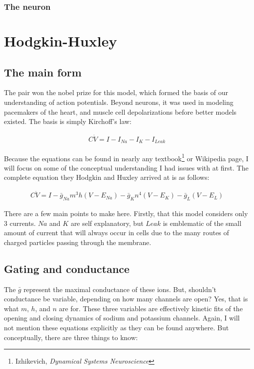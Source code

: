 \documentclass[12pt]{amsart}
\begin{document}
\subsubsection{The neuron}

\section{Hodgkin-Huxley} 

\subsection{The main form} The pair won the nobel prize for this model, which formed the basis of our understanding of action potentials. Beyond neurons, it was used in modeling pacemakers of the heart, and muscle cell depolarizations before better models existed.  The basis is simply Kirchoff's law: 

\bigskip

\begin{equation} \label{eq8}
\begin{split}
C\dot{V} = I - I_{Na} - I_{K} - I_{Leak}
\end{split}
\end{equation}

\bigskip

Because the equations can be found in nearly any textbook\footnote{Izhikevich, \textit{Dynamical Systems Neuroscience}} or Wikipedia page, I will focus on some of the conceptual understanding I had issues with at first. The complete equation they Hodgkin and Huxley arrived at is as follows: 

\bigskip

\begin{equation} \label{eq8}
\begin{split}
C\dot{V} = I - \bar{g}_{Na}m^3h(V - E_{Na}) - \bar{g}_{K}n^4(V - E_{K}) - \bar{g}_{L}(V - E_{L})
\end{split}
\end{equation}

\bigskip 

There are a few main points to make here. Firstly, that this model considers only 3 currents. $Na$ and $K$ are self explanatory, but $Leak$ is emblematic of the small amount of current that will always occur in cells due to the many routes of charged particles passing through the membrane.\newline

\subsection{Gating and conductance} The $\bar{g}$ represent the maximal conductance of these ions. But, shouldn't conductance be variable, depending on how many channels are open? Yes, that is what $m$, $h$, and $n$ are for. These three variables are effectively kinetic fits of the opening and closing dynamics of sodium and potassium channels. Again, I will not mention these equations explicitly as they can be found anywhere. But conceptually, there are three things to know:\newline
\end{document}

